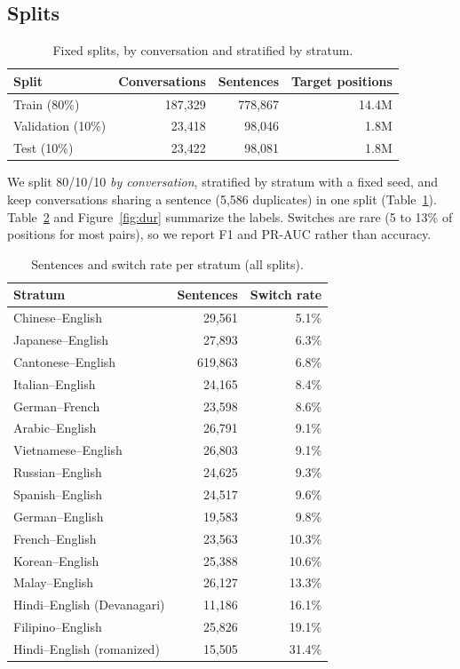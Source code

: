 \documentclass[sigconf,nonacm]{acmart}
\begin{document}
\subsection{Splits}
\begin{table}[t]
\caption{Fixed splits, by conversation and stratified by stratum.}
\label{tab:splits}
\small
\begin{tabular}{lrrr}
\toprule
Split & Conversations & Sentences & Target positions \\
\midrule
Train (80\%) & 187,329 & 778,867 & 14.4M \\
Validation (10\%) & 23,418 & 98,046 & 1.8M \\
Test (10\%) & 23,422 & 98,081 & 1.8M \\
\bottomrule
\end{tabular}
\end{table} We split 80/10/10 \emph{by conversation}, stratified by stratum with a
fixed seed, and keep conversations sharing a sentence (5,586 duplicates) in one split (Table~\ref{tab:splits}). Table~\ref{tab:data} and Figure~\ref{fig:dur} summarize the labels. Switches are rare (5 to
13\% of positions for most pairs), so we report F1 and PR-AUC rather than accuracy.

\begin{table}[t]
\caption{Sentences and switch rate per stratum (all splits).}
\label{tab:data}
\small
\begin{tabular}{lrr}
\toprule
Stratum & Sentences & Switch rate \\
\midrule
Chinese--English & 29,561 & 5.1\% \\
Japanese--English & 27,893 & 6.3\% \\
Cantonese--English & 619,863 & 6.8\% \\
Italian--English & 24,165 & 8.4\% \\
German--French & 23,598 & 8.6\% \\
Arabic--English & 26,791 & 9.1\% \\
Vietnamese--English & 26,803 & 9.1\% \\
Russian--English & 24,625 & 9.3\% \\
Spanish--English & 24,517 & 9.6\% \\
German--English & 19,583 & 9.8\% \\
French--English & 23,563 & 10.3\% \\
Korean--English & 25,388 & 10.6\% \\
Malay--English & 26,127 & 13.3\% \\
Hindi--English (Devanagari) & 11,186 & 16.1\% \\
Filipino--English & 25,826 & 19.1\% \\
Hindi--English (romanized) & 15,505 & 31.4\% \\
\bottomrule
\end{tabular}
\end{table}
\end{document}
